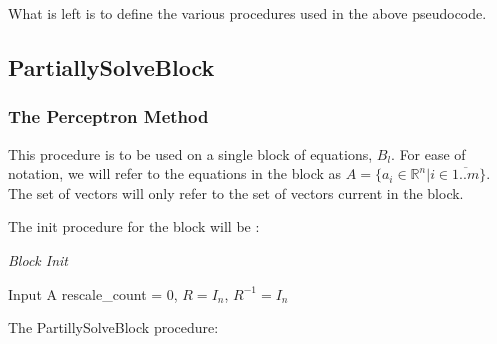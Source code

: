 \documentclass[a4paper,twoside,10pt]{report}
\begin{document}
\clearpage		
	
	What is left is to define the various procedures used in the above pseudocode.
	
	
	\subsection{PartiallySolveBlock}
	
	
	\subsubsection{The Perceptron Method}
		This procedure is to be used on a single block of equations, \(B_l\). For ease of notation, we will refer to the equations 
in the block as \(A = \{a_i\in\mathbb{R} ^n | i\in\overline{1..m}\}\). The set of vectors will only refer to the set of vectors current in the block.

	The init procedure for the block will be : 
	
	\begin{algorithm}
	\caption{\textit{Block Init}}
	\label{algBlockInit}
	\begin{center}
	\begin{algorithmic}
	
		\STATE Input A
		\STATE rescale{\_}count = 0, \(R = I_n\), \(R^{-1} = I_n\)	
	
	\end{algorithmic}
	\end{center}
	\end{algorithm}			
	
	The PartillySolveBlock procedure:
	
\end{document}
